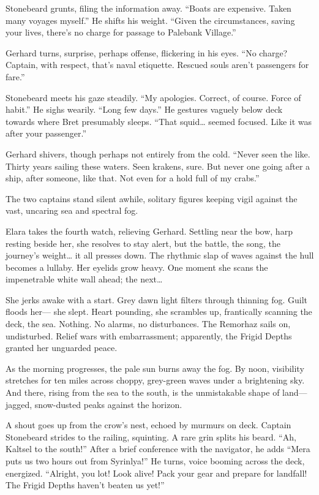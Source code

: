 \documentclass[
  letterpaper,12pt,twoside,twocolumn,openany,
  nodeprecatedcode,bg=full]{dndbook}
\begin{document}
Stonebeard grunts, filing the information away. ``Boats are expensive.
Taken many voyages myself.'' He shifts his weight. ``Given the
circumstances, saving your lives, there's no charge for passage to
Palebank Village.''

Gerhard turns, surprise, perhaps offense, flickering in his eyes. ``No
charge? Captain, with respect, that's naval etiquette. Rescued souls
aren't passengers for fare.''

Stonebeard meets his gaze steadily. ``My apologies. Correct, of course.
Force of habit.'' He sighs wearily. ``Long few days.'' He gestures
vaguely below deck towards where Bret presumably sleeps. ``That
squid\ldots{} seemed focused. Like it was after your passenger.''

Gerhard shivers, though perhaps not entirely from the cold. ``Never seen
the like. Thirty years sailing these waters. Seen krakens, sure. But
never one going after a ship, after someone, like that. Not even for a
hold full of my crabs.''

The two captains stand silent awhile, solitary figures keeping vigil
against the vast, uncaring sea and spectral fog.

Elara takes the fourth watch, relieving Gerhard. Settling near the bow,
harp resting beside her, she resolves to stay alert, but the battle, the
song, the journey's weight\ldots{} it all presses down. The rhythmic
slap of waves against the hull becomes a lullaby. Her eyelids grow
heavy. One moment she scans the impenetrable white wall ahead; the
next\ldots{}

She jerks awake with a start. Grey dawn light filters through thinning
fog. Guilt floods her--- she slept. Heart pounding, she scrambles up,
frantically scanning the deck, the sea. Nothing. No alarms, no
disturbances. The Remorhaz sails on, undisturbed. Relief wars with
embarrassment; apparently, the Frigid Depths granted her unguarded
peace.

As the morning progresses, the pale sun burns away the fog. By noon,
visibility stretches for ten miles across choppy, grey-green waves under
a brightening sky. And there, rising from the sea to the south, is the
unmistakable shape of land--- jagged, snow-dusted peaks against the
horizon.

A shout goes up from the crow's nest, echoed by murmurs on deck. Captain
Stonebeard strides to the railing, squinting. A rare grin splits his
beard. ``Ah, Kaltsel to the south!'' After a brief conference with the
navigator, he adds ``Mera puts us two hours out from Syrinlya!'' He
turns, voice booming across the deck, energized. ``Alright, you lot!
Look alive! Pack your gear and prepare for landfall! The Frigid Depths
haven't beaten us yet!''
\end{document}
